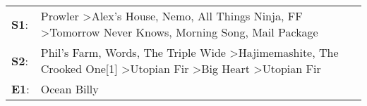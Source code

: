 \begin{supertabular}{p{0.03\textwidth}p{0.92\textwidth}}
 \textbf{S1}:  &                                  Prowler\textsuperscript{} \textgreater \enspace Alex's House\textsuperscript{}, \enspace Nemo\textsuperscript{}, \enspace All Things Ninja\textsuperscript{}, \enspace FF\textsuperscript{} \textgreater \enspace Tomorrow Never Knows\textsuperscript{}, \enspace Morning Song\textsuperscript{}, \enspace Mail Package\textsuperscript{}  \enspace  \\
 \textbf{S2}:  &  Phil's Farm\textsuperscript{}, \enspace Words\textsuperscript{}, \enspace The Triple Wide\textsuperscript{} \textgreater \enspace Hajimemashite\textsuperscript{}, \enspace The Crooked One[1]\textsuperscript{} \textgreater \enspace Utopian Fir\textsuperscript{} \textgreater \enspace Big Heart\textsuperscript{} \textgreater \enspace Utopian Fir\textsuperscript{}  \enspace  \\
 \textbf{E1}:  &                                                                                                                                                                                                                                                                                                                                               Ocean Billy\textsuperscript{}  \enspace  \\
\end{supertabular}
